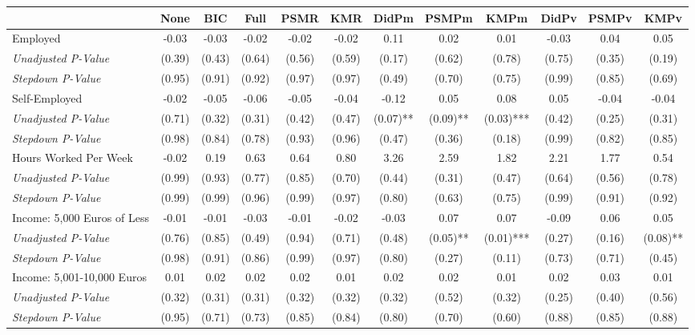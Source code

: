 \begin{tabular}{l c c c c c c c c c c c}
\toprule
 & None & BIC & Full & PSMR & KMR & DidPm & PSMPm & KMPm & DidPv & PSMPv & KMPv \\
\midrule
Employed & -0.03 & -0.03 & -0.02 & -0.02 & -0.02 & 0.11 & 0.02 & 0.01 & -0.03 & 0.04 & 0.05 \\
\quad \textit{Unadjusted P-Value} & (0.39) & (0.43) & (0.64) & (0.56) & (0.59) & (0.17) & (0.62) & (0.78) & (0.75) & (0.35) & (0.19) \\
\quad \textit{Stepdown P-Value} & (0.95) & (0.91) & (0.92) & (0.97) & (0.97) & (0.49) & (0.70) & (0.75) & (0.99) & (0.85) & (0.69) \\
Self-Employed & -0.02 & -0.05 & -0.06 & -0.05 & -0.04 & -0.12 & 0.05 & 0.08 & 0.05 & -0.04 & -0.04 \\
\quad \textit{Unadjusted P-Value} & (0.71) & (0.32) & (0.31) & (0.42) & (0.47) & (0.07)** & (0.09)** & (0.03)*** & (0.42) & (0.25) & (0.31) \\
\quad \textit{Stepdown P-Value} & (0.98) & (0.84) & (0.78) & (0.93) & (0.96) & (0.47) & (0.36) & (0.18) & (0.99) & (0.82) & (0.85) \\
Hours Worked Per Week & -0.02 & 0.19 & 0.63 & 0.64 & 0.80 & 3.26 & 2.59 & 1.82 & 2.21 & 1.77 & 0.54 \\
\quad \textit{Unadjusted P-Value} & (0.99) & (0.93) & (0.77) & (0.85) & (0.70) & (0.44) & (0.31) & (0.47) & (0.64) & (0.56) & (0.78) \\
\quad \textit{Stepdown P-Value} & (0.99) & (0.99) & (0.96) & (0.99) & (0.97) & (0.80) & (0.63) & (0.75) & (0.99) & (0.91) & (0.92) \\
Income: 5,000 Euros of Less & -0.01 & -0.01 & -0.03 & -0.01 & -0.02 & -0.03 & 0.07 & 0.07 & -0.09 & 0.06 & 0.05 \\
\quad \textit{Unadjusted P-Value} & (0.76) & (0.85) & (0.49) & (0.94) & (0.71) & (0.48) & (0.05)** & (0.01)*** & (0.27) & (0.16) & (0.08)** \\
\quad \textit{Stepdown P-Value} & (0.98) & (0.91) & (0.86) & (0.99) & (0.97) & (0.80) & (0.27) & (0.11) & (0.73) & (0.71) & (0.45) \\
Income: 5,001-10,000 Euros & 0.01 & 0.02 & 0.02 & 0.02 & 0.01 & 0.02 & 0.02 & 0.01 & 0.02 & 0.03 & 0.01 \\
\quad \textit{Unadjusted P-Value} & (0.32) & (0.31) & (0.31) & (0.32) & (0.32) & (0.32) & (0.52) & (0.32) & (0.25) & (0.40) & (0.56) \\
\quad \textit{Stepdown P-Value} & (0.95) & (0.71) & (0.73) & (0.85) & (0.84) & (0.80) & (0.70) & (0.60) & (0.88) & (0.85) & (0.88) \\

\end{tabular}

